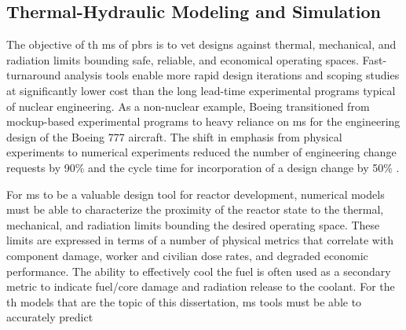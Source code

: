\subsection{Thermal-Hydraulic Modeling and Simulation}
\label{sec:ph_motivation}

The objective of \gls{th} \gls{ms} of \glspl{pbr} is to vet designs against thermal, mechanical, and radiation limits bounding safe, reliable, and economical operating spaces. Fast-turnaround analysis tools enable more rapid design iterations and scoping studies at significantly lower cost than the long lead-time experimental programs typical of nuclear engineering. As a non-nuclear example, Boeing transitioned from mockup-based experimental programs to heavy reliance on \gls{ms} for the engineering design of the Boeing 777 aircraft. The shift in emphasis from physical experiments to numerical experiments reduced the number of engineering change requests by 90\% and the cycle time for incorporation of a design change by 50\% \cite{boeing}.

For \gls{ms} to be a valuable design tool for reactor development, numerical models must be able to characterize the proximity of the reactor state to the thermal, mechanical, and radiation limits bounding the desired operating space. These limits are expressed in terms of a number of physical metrics that correlate with component damage, worker and civilian dose rates, and degraded economic performance. The ability to effectively cool the fuel is often used as a secondary metric to indicate fuel/core damage and radiation release to the coolant. For the \gls{th} models that are the topic of this dissertation, \gls{ms} tools must be able to accurately predict


